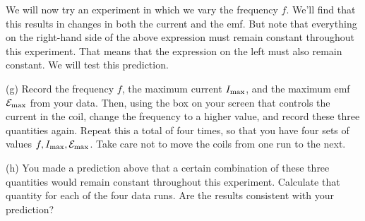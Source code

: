 \pagebreak[3]
We will now try an experiment in which we vary the frequency $f$.  We'll
find that this results in changes in both the current and the emf.
But note that everything on the right-hand side of the above expression
must remain constant throughout this experiment.  That
means that the expression on the left must also remain
constant.  We will test this prediction.

(g) Record the frequency $f$, the maximum current $I_{\rm max}$, and the
maximum emf ${\cal E}_{\rm max}$ from your data.
Then, using the box on your screen that controls the 
current in the coil, change the frequency to a higher value,
and record these three quantities again.  Repeat this a total of four
times, so that you have four sets of values $f,I_{\rm max},{\cal E}_{\rm max}$.
Take care not to move the coils from one run to the next.
\answerspace{3in}

(h) You made a prediction above that a certain combination of these
three quantities would remain constant throughout this experiment.
Calculate that quantity for each of the four data runs.  Are the
results consistent with your prediction?
\answerspace{3in}


